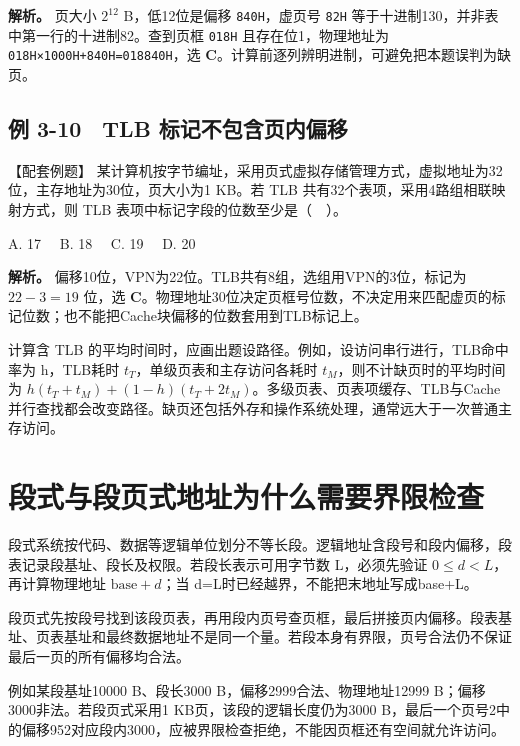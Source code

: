 \textbf{解析。} 页大小 \(2^{12}\) B，低12位是偏移 \texttt{840H}，虚页号 \texttt{82H} 等于十进制130，并非表中第一行的十进制82。查到页框 \texttt{018H} 且存在位1，物理地址为 \texttt{018H×1000H+\allowbreak{}840H=\allowbreak{}018840H}，选 \textbf{C}。计算前逐列辨明进制，可避免把本题误判为缺页。

\subsection{例 3-10　TLB 标记不包含页内偏移}\label{CO03-26}

\begin{example}[配套例题]

【配套例题】 某计算机按字节编址，采用页式虚拟存储管理方式，虚拟地址为32位，主存地址为30位，页大小为1 KB。若 TLB 共有32个表项，采用4路组相联映射方式，则 TLB 表项中标记字段的位数至少是（　）。

A. 17　 B. 18　 C. 19　 D. 20

\end{example}

\textbf{解析。} 偏移10位，VPN为22位。TLB共有8组，选组用VPN的3位，标记为 \(22-3=19\) 位，选 \textbf{C}。物理地址30位决定页框号位数，不决定用来匹配虚页的标记位数；也不能把Cache块偏移的位数套用到TLB标记上。

计算含 TLB 的平均时间时，应画出题设路径。例如，设访问串行进行，TLB命中率为 h，TLB耗时 \(t_T\)，单级页表和主存访问各耗时 \(t_M\)，则不计缺页时的平均时间为 \(h(t_T+t_M)+(1-h)(t_T+2t_M)\)。多级页表、页表项缓存、TLB与Cache并行查找都会改变路径。缺页还包括外存和操作系统处理，通常远大于一次普通主存访问。

\section{段式与段页式地址为什么需要界限检查}\label{CO03-27}

段式系统按代码、数据等逻辑单位划分不等长段。逻辑地址含段号和段内偏移，段表记录段基址、段长及权限。若段长表示可用字节数 L，必须先验证 \(0\le d<L\)，再计算物理地址 \(\mathrm{base}+d\)；当 d=L时已经越界，不能把末地址写成base+L。

段页式先按段号找到该段页表，再用段内页号查页框，最后拼接页内偏移。段表基址、页表基址和最终数据地址不是同一个量。若段本身有界限，页号合法仍不保证最后一页的所有偏移均合法。

例如某段基址10000 B、段长3000 B，偏移2999合法、物理地址12999 B；偏移3000非法。若段页式采用1 KB页，该段的逻辑长度仍为3000 B，最后一个页号2中的偏移952对应段内3000，应被界限检查拒绝，不能因页框还有空间就允许访问。

